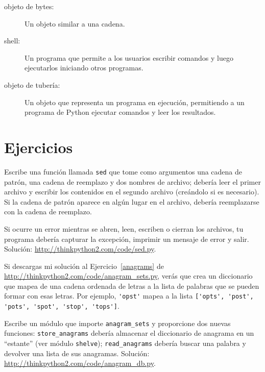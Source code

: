 \documentclass[10pt]{book}
\begin{document}
\begin{description}
\item[objeto de bytes:] Un objeto similar a una cadena.

\item[shell:] Un programa que permite a los usuarios escribir comandos y luego
ejecutarlos iniciando otros programas.

\item[objeto de tubería:] Un objeto que representa un programa en ejecución, permitiendo
a un programa de Python ejecutar comandos y leer los resultados.

\end{description}


\section{Ejercicios}

\begin{exercise}

Escribe una función llamada {\tt sed} que tome como argumentos una cadena de patrón,
una cadena de reemplazo y dos nombres de archivo; debería leer el primer archivo
y escribir los contenidos en el segundo archivo (creándolo si es
necesario).  Si la cadena de patrón aparece en algún lugar en el archivo,
debería reemplazarse con la cadena de reemplazo.

Si ocurre un error mientras se abren, leen, escriben o cierran los archivos,
tu programa debería capturar la excepción, imprimir un mensaje de error y
salir.  Solución: \url{http://thinkpython2.com/code/sed.py}.

\end{exercise}


\begin{exercise}

Si descargas mi solución al Ejercicio~\ref{anagrams} de
\url{http://thinkpython2.com/code/anagram_sets.py}, verás que crea
un diccionario que mapea de una cadena ordenada de letras a la lista de
palabras que se pueden formar con esas letras.  Por ejemplo,
\verb"'opst'" mapea a la lista
\verb"['opts', 'post', 'pots', 'spot', 'stop', 'tops']".

Escribe un módulo que importe \verb"anagram_sets" y proporcione
dos nuevas funciones: \verb"store_anagrams" debería almacenar el
diccionario de anagrama en un ``estante'' (ver módulo {\tt shelve}); \verb"read_anagrams" debería
buscar una palabra y devolver una lista de sus anagramas.
Solución: \url{http://thinkpython2.com/code/anagram_db.py}.

\end{exercise}
\end{document}
